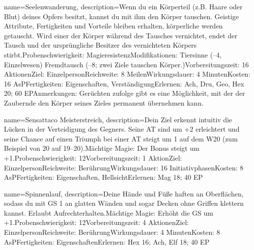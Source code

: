 {
    name={Seelenwanderung},
    description={Wenn du ein Körperteil (z.B. Haare oder Blut) deines Opfers besitzt, kannst du mit ihm den Körper tauschen. Geistige Attribute, Fertigkeiten und Vorteile bleiben erhalten, körperliche werden getauscht. Wird einer der Körper während des Tausches vernichtet, endet der Tausch und der ursprüngliche Besitzer des vernichteten Körpers stirbt.\newline Probenschwierigkeit: Magieresistenz\newline Modifikationen: Tiersinne (–4, Einzelwesen) Fremdtausch (–8; zwei Ziele tauschen Körper.)\newline Vorbereitungszeit: 16 Aktionen\newline Ziel: Einzelperson\newline Reichweite: 8 Meilen\newline Wirkungsdauer: 4 Minuten\newline Kosten: 16 AsP\newline Fertigkeiten: Eigenschaften, Verständigung\newline Erlernen: Ach, Dru, Geo, Hex 20; 60 EP\newline Anmerkungen: Gerüchten zufolge gibt es eine Möglichkeit, mit der der Zaubernde den Körper seines Zieles permanent übernehmen kann.}
}


{
    name={Sensattaco Meisterstreich},
    description={Dein Ziel erkennt intuitiv die Lücken in der Verteidigung des Gegners. Seine AT sind um +2 erleichtert und seine Chance auf einen Triumph bei einer AT steigt um 1 auf dem W20 (zum Beispiel von 20 auf 19–20).\newline Mächtige Magie: Der Bonus steigt um +1.\newline Probenschwierigkeit: 12\newline Vorbereitungszeit: 1 Aktion\newline Ziel: Einzelperson\newline Reichweite: Berührung\newline Wirkungsdauer: 16 Initiativphasen\newline Kosten: 8 AsP\newline Fertigkeiten: Eigenschaften, Hellsicht\newline Erlernen: Mag 18; 40 EP}
}


{
    name={Spinnenlauf},
    description={Deine Hände und Füße haften an Oberflächen, sodass du mit GS 1 an glatten Wänden und sogar Decken ohne Griffen klettern kannst. Erlaubt Aufrechterhalten.\newline Mächtige Magie: Erhöht die GS um +1.\newline Probenschwierigkeit: 12\newline Vorbereitungszeit: 4 Aktionen\newline Ziel: Einzelperson\newline Reichweite: Berührung\newline Wirkungsdauer: 4 Minuten\newline Kosten: 8 AsP\newline Fertigkeiten: Eigenschaften\newline Erlernen: Hex 16; Ach, Elf 18; 40 EP}
}


